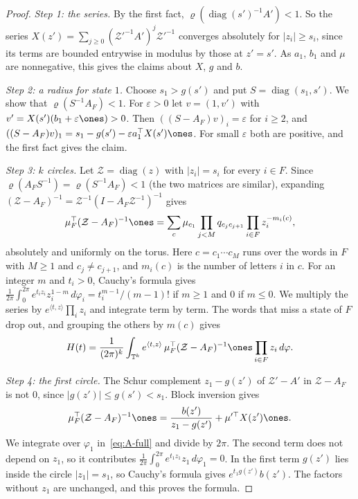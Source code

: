 \begin{proof}
\emph{Step 1: the series.} By the first fact,
$\varrho(\operatorname{diag}(s')^{-1}A')<1$. So the series
$X(z')=\sum_{j\ge0}(\mathcal Z'^{-1}A')^j\mathcal Z'^{-1}$ converges
absolutely for $|z_i|\ge s_i$, since its terms are bounded
entrywise in modulus by those at $z'=s'$. As $a_1$, $b_1$ and $\mu$ are
nonnegative, this gives the claims about $X$, $g$ and $b$.

\emph{Step 2: a radius for state $1$.} Choose $s_1>g(s')$ and put
$S=\operatorname{diag}(s_1,s')$. We show that $\varrho(S^{-1}A_F)<1$. For
$\varepsilon>0$ let $v=(1,v')$ with
$v'=X(s')(b_1+\varepsilon\ones)>0$. Then $((S-A_F)v)_i=\varepsilon$ for
$i\ge2$, and $((S-A_F)v)_1=s_1-g(s')-\varepsilon a_1^\top X(s')\ones$. For
small $\varepsilon$ both are positive, and the first fact gives the claim.

\emph{Step 3: $k$ circles.} Let $\mathcal Z=\operatorname{diag}(z)$ with
$|z_i|=s_i$ for every $i\in F$. Since $\varrho(A_FS^{-1})=\varrho(S^{-1}A_F)<1$ (the two matrices are similar), expanding
$(\mathcal Z-A_F)^{-1}=\mathcal Z^{-1}(I-A_F\mathcal Z^{-1})^{-1}$ gives
\[
\mu_F^\top(\mathcal Z-A_F)^{-1}\ones=\sum_c\mu_{c_1}\prod_{j<M}q_{c_jc_{j+1}}
\prod_{i\in F}z_i^{-m_i(c)},
\]
absolutely and uniformly on the torus. Here $c=c_1\cdots c_M$ runs over the
words in $F$ with $M\ge1$ and $c_j\ne c_{j+1}$, and $m_i(c)$ is the number of
letters $i$ in $c$. For an integer $m$ and $t_i>0$, Cauchy's formula gives
$\frac1{2\pi}\int_0^{2\pi}e^{t_iz_i}z_i^{1-m}\,d\varphi_i=t_i^{m-1}/(m-1)!$ if
$m\ge1$ and $0$ if $m\le0$. We multiply the series by
$e^{\langle t,z\rangle}\prod_iz_i$ and integrate term by term. The words that
miss a state of $F$ drop out, and grouping the others by $m(c)$ gives
\begin{equation}\label{eq:A-full}
H(t)=\frac1{(2\pi)^k}\int_{\mathbb T^k}e^{\langle t,z\rangle}\,
\mu_F^\top(\mathcal Z-A_F)^{-1}\ones\prod_{i\in F}z_i\,d\varphi .
\end{equation}

\emph{Step 4: the first circle.} The Schur complement $z_1-g(z')$ of
$\mathcal Z'-A'$ in $\mathcal Z-A_F$ is not $0$, since
$|g(z')|\le g(s')<s_1$. Block inversion gives
\[
\mu_F^\top(\mathcal Z-A_F)^{-1}\ones=\frac{b(z')}{z_1-g(z')}
+\mu'^\top X(z')\ones .
\]
We integrate over $\varphi_1$ in~\eqref{eq:A-full} and divide by $2\pi$. The
second term does not depend on $z_1$, so it contributes
$\frac1{2\pi}\int_0^{2\pi}e^{t_1z_1}z_1\,d\varphi_1=0$. In the first term
$g(z')$ lies inside the circle $|z_1|=s_1$, so Cauchy's formula gives
$e^{t_1g(z')}b(z')$. The factors without $z_1$ are unchanged, and this proves
the formula.
\end{proof}

